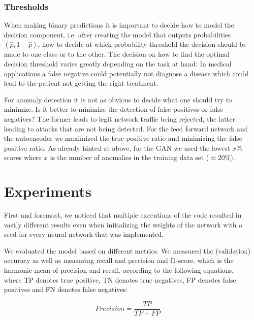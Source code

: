\documentclass[]{article}
\begin{document}
	\subsubsection{Thresholds}
     When making binary predictions it is important to decide how to model the decision component, i.e. after creating the model that outputs probabilities $(\hat{p}, 1-\hat{p})$, how to decide at which probability threshold the decision should be made to one class or to the other. The decision on how to find the optimal decision threshold varies greatly depending on the task at hand: In medical applications a false negative could potentially not diagnose a disease which could lead to the patient not getting the right treatment.
     \newline
     
     \noindent
     For anomaly detection it is not as obvious to decide what one should try to minimize. Is it better to minimize the detection of false positives or false negatives? The former leads to legit network traffic being rejected, the latter leading to attacks that are not being detected. For the feed forward network and the autoencoder we maximized the true positive ratio and minimizing the false positive ratio. As already hinted at above, for the GAN we used the lowest $x\%$ scores where $x$ is the number of anomalies in the training data set ($\approx20$\%).
     
	
	
	\section{Experiments}
	First and foremost, we noticed that multiple executions of the code resulted in vastly different results even when initializing the weights of the network with a seed for every neural network that was implemented. 
	\newline
	
	\noindent
	We evaluated the model based on different metrics. We measured the (validation) accuracy as well as measuring recall and precision and f1-score, which is the harmonic mean of precision and recall, according to the following equations, where TP denotes true positive, TN denotes true negatives, FP denotes false positives and FN denotes false negatives: 
	
	\begin{equation}
		Precision = \frac{TP}{TP + FP}
	\end{equation}
	
\end{document}

